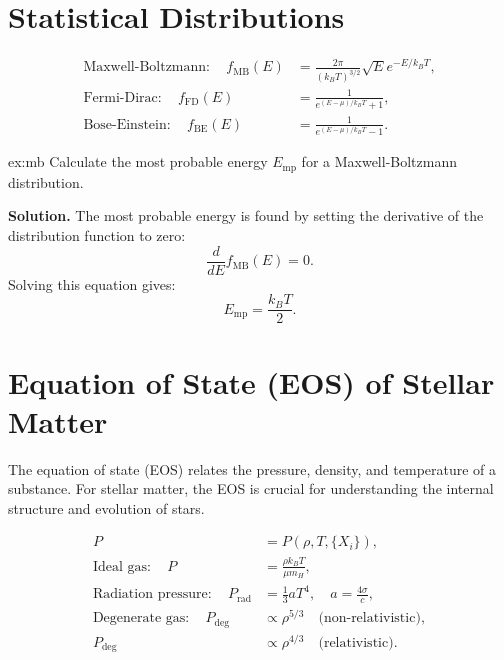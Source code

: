 \section{Statistical Distributions}
\begin{theory}
\begin{align}   
\text{Maxwell-Boltzmann}: \quad f_{\text{MB}}(E) &= \frac{2\pi}{(k_B T)^{3/2}} \sqrt{E} e^{-E/k_B T}, \\
\text{Fermi-Dirac}: \quad f_{\text{FD}}(E) &= \frac{1}{e^{(E-\mu)/k_B T} + 1}, \\
\text{Bose-Einstein}: \quad f_{\text{BE}}(E) &= \frac{1}{e^{(E-\mu)/k_B T} - 1}.
\end{align}
\end{theory}

\begin{example}{}{ex:mb}
Calculate the most probable energy $E_{\text{mp}}$ for a Maxwell-Boltzmann distribution.

\smallskip\textbf{Solution.}
The most probable energy is found by setting the derivative of the distribution function to zero:
\begin{equation}
\frac{d}{dE} f_{\text{MB}}(E) = 0.
\end{equation}
Solving this equation gives:
\begin{equation}
E_{\text{mp}} = \frac{k_B T}{2}.
\end{equation}
\end{example}

\section{Equation of State (EOS) of Stellar Matter}
\begin{intuition}
The equation of state (EOS) relates the pressure, density, and temperature of a substance. For stellar matter, the EOS is crucial for understanding the internal structure and evolution of stars.
\end{intuition}

\begin{theory}
\begin{align}
P &= P(\rho, T, \{X_i\}), \\    
\text{Ideal gas}: \quad P &= \frac{\rho k_B T}{\mu m_H}, \\
\text{Radiation pressure}: \quad P_{\text{rad}} &= \frac{1}{3}aT^4, \quad a = \frac{4\sigma}{c}, \\
\text{Degenerate gas}: \quad P_{\text{deg}} &\propto \rho^{5/3} \quad \text{(non-relativistic)}, \\
P_{\text{deg}} &\propto \rho^{4/3} \quad \text{(relativistic)}.
\end{align}
\end{theory}

